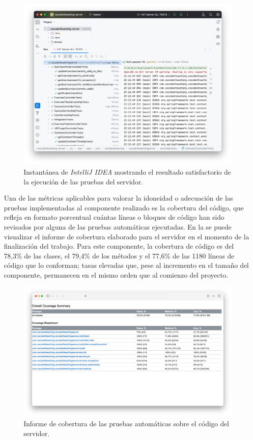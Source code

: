 \begin{figure}[ht]
    \centering
    \includegraphics[width=\textwidth]{imagenes/utilizadas/4-4-verificacion/testsServidor.png}
    \caption{Instantánea de \textit{IntelliJ IDEA} mostrando el resultado satisfactorio de la ejecución de las pruebas del servidor.}
    \label{fig:testsServidorIDE}
\end{figure}

Una de las métricas aplicables para valorar la idoneidad o adecuación de las pruebas implementadas al componente realizado es la cobertura del código, que refleja en formato porcentual cuántas líneas o bloques de código han sido revisados por alguna de las pruebas automáticas ejecutadas. En la  se puede visualizar el informe de cobertura elaborado para el servidor en el momento de la finalización del trabajo. Para este componente, la cobertura de código es del 78,3\% de las clases, el 79,4\% de los métodos y el 77,6\% de las 1180 líneas de código que lo conforman; tasas elevadas que, pese al incremento en el tamaño del componente, permanecen en el mismo orden que al comienzo del proyecto.

\begin{figure}[ht]
    \centering
    \includegraphics[width=\textwidth]{imagenes/utilizadas/4-4-verificacion/coverageServidorFinal.png}
    \caption{Informe de cobertura de las pruebas automáticas sobre el código del servidor.}
    \label{fig:coberturaServidorFinal}
\end{figure}

